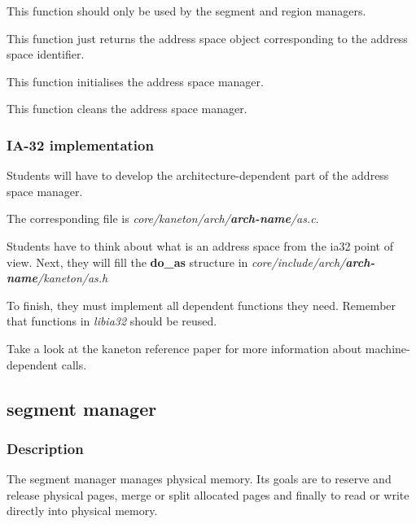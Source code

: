 
This function should only be used by the segment and region managers.

This function just returns the address space object corresponding to
the address space identifier.


This function initialises the address space manager.


This function cleans the address space manager.

%
%

\subsubsection{IA-32 implementation}

Students will  have to develop the architecture-dependent  part of the
address space manager.

The corresponding file is \textit{core/kaneton/arch/\textbf{arch-name}/as.c}.

Students have  to think about what  is an address space  from the ia32
point of view.  Next, they will fill the \textbf{do\_as} structure in
\textit{core/include/arch/\textbf{arch-name}/kaneton/as.h}

To  finish,   they  must   implement  all  dependent   functions  they
need. Remember that functions in \textit{libia32} should be reused.

Take a look at the  kaneton reference paper for more information about
machine-dependent calls.

%
%

\subsection{segment manager}

\subsubsection{Description}

The segment manager manages physical  memory. Its goals are to reserve
and release physical pages, merge or split allocated pages and finally
to read or write directly into physical memory.

